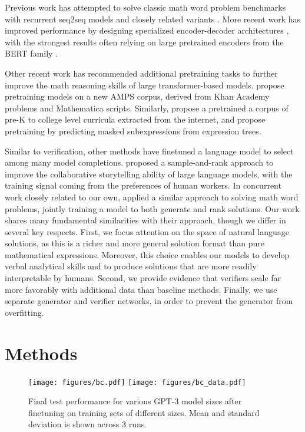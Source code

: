 {Previous work has attempted to solve classic math word problem benchmarks with recurrent seq2seq models \citep{sutskever2014sequence} and closely related variants \citep{wang-etal-2017-deep, huang2018neural}. More recent work has improved performance by designing specialized encoder-decoder architectures \citep{amini2019mathqa, chiang2018semantically, Xie2019AGT, Chen2020MappingNP, li2020graph}, with the strongest results often relying on large pretrained encoders from the BERT family \citep{chen2019neural, kim2020point, mwpbert}.

Other recent work has recommended additional pretraining tasks to further improve the math reasoning skills of large transformer-based models. \cite{hendrycks2021measuring} propose pretraining models on a new AMPS corpus, derived from Khan Academy problems and Mathematica scripts. Similarly, \cite{shen2021mathbert} propose a pretrained a corpus of pre-K to college level curricula extracted from the internet, and \cite{Peng2021MathBERTAP} propose pretraining by predicting masked subexpressions from expression trees.

Similar to verification, other methods have finetuned a language model to select among many model completions. \cite{nichols2020collaborative} proposed a sample-and-rank approach to improve the collaborative storytelling ability of large language models, with the training signal coming from the preferences of human workers. In concurrent work closely related to our own, \cite{shen2021generate} applied a similar approach to solving math word problems, jointly training a model to both generate and rank solutions. Our work shares many fundamental similarities with their approach, though we differ in several key respects. First, we focus attention on the space of natural language solutions, as this is a richer and more general solution format than pure mathematical expressions. Moreover, this choice enables our models to develop verbal analytical skills and to produce solutions that are more readily interpretable by humans. Second, we provide evidence that verifiers scale far more favorably with additional data than baseline methods. Finally, we use separate generator and verifier networks, in order to prevent the generator from overfitting.

\section{Methods}

\begin{figure*}
\centering
\texttt{[image: figures/bc.pdf]}
\texttt{[image: figures/bc\_data.pdf]}
\caption{Final test performance for various GPT-3 model sizes after finetuning on training sets of different sizes. Mean and standard deviation is shown across 3 runs.}
\label{fig:bc_baseline}
\end{figure*}

}
